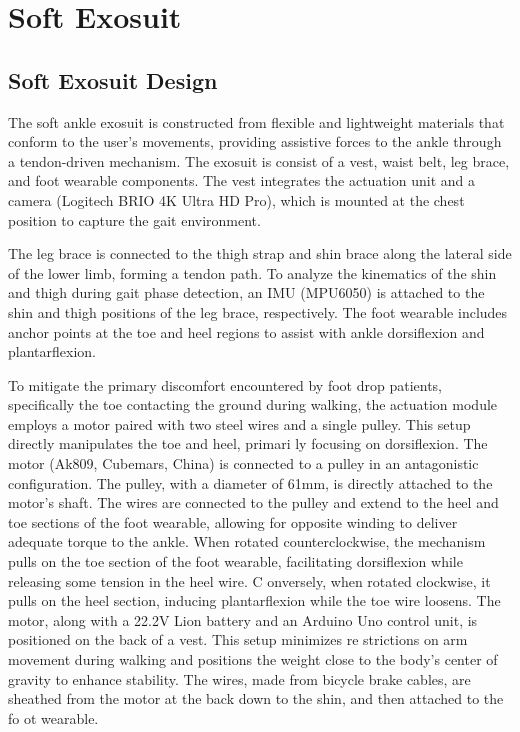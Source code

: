 \documentclass[journal,article,submit,pdftex,moreauthors]{Definitions/mdpi}
\begin{document}
\section{Soft Exosuit}

\subsection{Soft Exosuit Design}
The soft ankle exosuit is constructed from flexible and lightweight materials that conform to the user's movements, providing assistive forces to the ankle through a tendon-driven mechanism. 
The exosuit is consist of a vest, waist belt, leg brace, and foot wearable components. The vest integrates the actuation unit and a camera (Logitech BRIO 4K Ultra HD Pro), which is mounted at the chest position to capture the gait environment.

The leg brace is connected to the thigh strap and shin brace along the lateral side of the lower limb, forming a tendon path. To analyze the kinematics of the shin and thigh during gait phase detection, an IMU (MPU6050) is attached to the shin and thigh positions of the leg brace, respectively. The foot wearable includes anchor points at the toe and heel regions to assist with ankle dorsiflexion and plantarflexion.

To mitigate the primary discomfort encountered by foot drop patients, specifically the toe
contacting the ground during walking, the actuation module employs a motor paired with two steel wires and a single pulley. This setup directly manipulates the toe and heel, primari ly focusing on dorsiflexion. The motor (Ak809, Cubemars, China) is connected to a pulley in an antagonistic configuration. The pulley, with a diameter of 61mm, is directly attached to the motor's shaft. The wires are connected to the pulley and extend to the heel and toe sections of the foot wearable, allowing for opposite winding to deliver adequate torque to the ankle. When rotated counterclockwise, the mechanism pulls on the toe section of the foot wearable, facilitating dorsiflexion while releasing some tension in the heel wire. C onversely, when rotated clockwise, it pulls on the heel section, inducing plantarflexion while the toe wire loosens. The motor, along with a 22.2V Lion battery and an Arduino Uno control unit, is positioned on the back of a vest. This setup minimizes re strictions on arm movement during walking and positions the weight close to the body’s center of gravity to enhance stability. The wires, made from bicycle brake cables, are sheathed from the motor at the back down to the shin, and then attached to the fo ot wearable.
\end{document}
